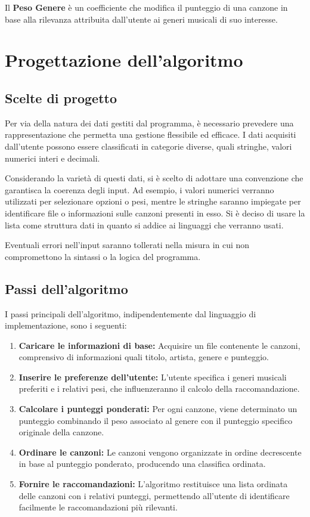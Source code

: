 \documentclass[a4paper,11pt]{article}
\begin{document}
\noindent
Il \textbf{Peso Genere} è un coefficiente che modifica il punteggio di una canzone in base alla rilevanza attribuita dall'utente ai generi musicali di suo interesse.

\newpage
\section{Progettazione dell'algoritmo}
\subsection{Scelte di progetto}
Per via della natura dei dati gestiti dal programma, è necessario prevedere una rappresentazione che permetta una gestione flessibile ed efficace. I dati acquisiti dall'utente possono essere classificati in categorie diverse, quali stringhe, valori numerici interi e decimali. 

Considerando la varietà di questi dati, si è scelto di adottare una convenzione che garantisca la coerenza degli input. Ad esempio, i valori numerici verranno utilizzati per selezionare opzioni o pesi, mentre le stringhe saranno impiegate per identificare file o informazioni sulle canzoni presenti in esso. Si è deciso di usare la lista come struttura dati in quanto si addice ai linguaggi che verranno usati. 

 Eventuali errori nell'input saranno tollerati nella misura in cui non compromettono la sintassi o la logica del programma. 

\subsection{Passi dell'algoritmo}
I passi principali dell'algoritmo, indipendentemente dal linguaggio di implementazione, sono i seguenti:

\begin{enumerate}
    \item \textbf{Caricare le informazioni di base:} 
    Acquisire un file contenente le canzoni, comprensivo di informazioni quali titolo, artista, genere e punteggio.
    \item \textbf{Inserire le preferenze dell'utente:} 
    L’utente specifica i generi musicali preferiti e i relativi pesi, che influenzeranno il calcolo della raccomandazione.
    \item \textbf{Calcolare i punteggi ponderati:} 
    Per ogni canzone, viene determinato un punteggio combinando il peso associato al genere con il punteggio specifico originale della canzone.
    \item \textbf{Ordinare le canzoni:} 
    Le canzoni vengono organizzate in ordine decrescente in base al punteggio ponderato, producendo una classifica ordinata.
    \item \textbf{Fornire le raccomandazioni:} 
    L'algoritmo restituisce una lista ordinata delle canzoni con i relativi punteggi, permettendo all'utente di identificare facilmente le raccomandazioni più rilevanti.
\end{enumerate}
\end{document}
